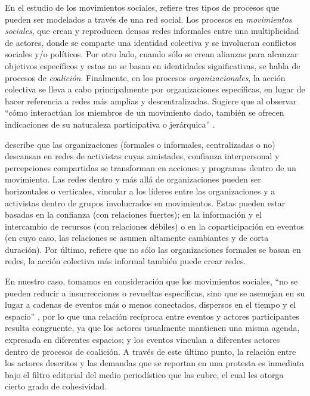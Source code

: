 \documentclass[letterpaper, 11pt]{book}
\theoremstyle{definition}
\theoremstyle{remark}
\begin{document}
En el estudio de los movimientos sociales, \citet{2014_Caiani_SNA} refiere tres tipos de procesos que pueden ser modelados a través de una red social. 
Los procesos en \emph{movimientos sociales}, que crean y reproducen densas redes informales entre una multiplicidad de actores, donde se comparte una identidad colectiva y se involucran conflictos sociales y/o políticos. 
Por otro lado, cuando sólo se crean alianzas para alcanzar objetivos específicos y estas no se basan en identidades significativas, se habla de procesos de \emph{coalición}. 
Finalmente, en los procesos \emph{organizacionales}, la acción colectiva se lleva a cabo principalmente por organizaciones específicas, en lugar de hacer referencia a redes más amplias y descentralizadas. 
Sugiere que al observar ``cómo interactúan los miembros de un movimiento dado, también se ofrecen indicaciones de su naturaleza participativa o jerárquica'' \citep[386]{2014_Caiani_SNA}. 


\citet{2011_Tarrow_PowerMovement} describe que las organizaciones (formales o informales, centralizadas o no) descansan en redes de activistas cuyas amistades, confianza interpersonal y percepciones compartidas se transforman en acciones y programas dentro de un movimiento. 
Las redes dentro y más allá de organizaciones pueden ser horizontales o verticales, vincular a los líderes entre las organizaciones y a activistas dentro de grupos involucrados en movimientos. 
Estas pueden estar basadas en la confianza (con relaciones fuertes); en la información y el intercambio de recursos (con relaciones débiles) o en la coparticipación en eventos (en cuyo caso, las relaciones se asumen altamente cambiantes y de corta duración). 
Por último, refiere que no sólo las organizaciones formales se basan en redes, la acción colectiva más informal también puede crear redes. 


En nuestro caso, tomamos en consideración que los movimientos sociales, ``no se pueden reducir a insurrecciones o revueltas específicas, sino que se asemejan en su lugar a cadenas de eventos más o menos conectados, dispersos en el tiempo y el espacio'' \citep[1]{2003_Diani_SocialNetworks}, por lo que una relación recíproca entre eventos y actores participantes resulta congruente, ya que los actores usualmente mantienen una misma agenda, expresada en diferentes espacios; y los eventos vinculan a diferentes actores dentro de procesos de coalición. 
A través de este último punto, la relación entre los actores descritos y las demandas que se reportan en una protesta es inmediata bajo el filtro editorial del medio periodístico que las cubre, el cual les otorga cierto grado de cohesividad. 
\end{document}
